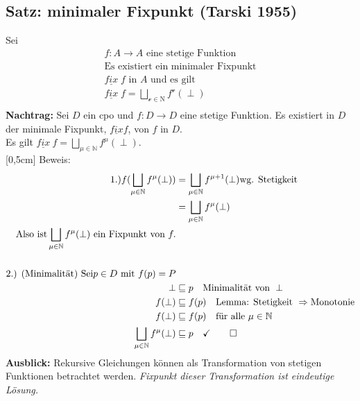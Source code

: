 \begin{compactitem}
\subsection{Satz: minimaler Fixpunkt (Tarski 1955)}
Sei
\begin{align*}
f: A \rightarrow A \text{ eine stetige Funktion} \\ 
\text{Es existiert ein minimaler Fixpunkt}\\
\underline{fix}\; f \text{ in } A \text { und es gilt}\\
\underline{fix}\; f = \bigsqcup_{\mathcal{v} \in \mathrm{N}} f^\mathcal{v}(\perp)\\
\end{align*}
\textbf{Nachtrag:} Sei $D$ ein cpo und $f:D \rightarrow D$ eine stetige Funktion. Es existiert in $D$ der minimale Fixpunkt, $\underline{fix} f$, von $f$ in $D$.\\
Es gilt $\underline{fix}\ f = \bigsqcup_{\mu \in \mathbb{N}} f^\mu (\perp)$.\\
[0,5cm]
Beweis:\\
\begin{align*}
\text{1.)} f(\bigsqcup_{\mu \in \mathbb{N}} f^\mu (\perp)) &= \bigsqcup_{\mu \in \mathbb{N}} f^{\mu +1 }(\perp) \text{wg. Stetigkeit}\\
&= \bigsqcup_{\mu \in \mathbb{N}} f^{\mu}(\perp)\\
\text{Also ist} \bigsqcup_{\mu \in \mathbb{N}} f^{\mu}(\perp) \text{ ein Fixpunkt von } f.\\
\\
\text{2.) (Minimalität) Sei} p \in D \text{ mit } f(p) = P\\
\perp  &\sqsubseteq p \quad \text{Minimalität von } \perp \\
f(\perp)  &\sqsubseteq f(p) \quad \text{Lemma: Stetigkeit } \Rightarrow \text{Monotonie}\\
f(\perp)  &\sqsubseteq f(p) \quad \text{für alle } \mu \in \mathbb{N}\\
\bigsqcup_{\mu \in \mathbb{N}} f^\mu (\perp)  &\sqsubseteq p \quad \checkmark \qed \\
\end{align*}
\textbf{Ausblick:} Rekursive Gleichungen können als Transformation von stetigen Funktionen betrachtet werden. \emph{Fixpunkt dieser Transformation ist eindeutige Lösung.}

\end{compactitem}
